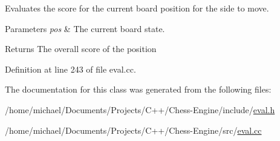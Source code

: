 Evaluates the score for the current board position for the side to move. 


\begin{DoxyParams}{Parameters}
{\em pos} & The current board state. \\
\hline
\end{DoxyParams}
\begin{DoxyReturn}{Returns}
The overall score of the position 
\end{DoxyReturn}


Definition at line 243 of file eval.\+cc.



The documentation for this class was generated from the following files\+:\begin{DoxyCompactItemize}
\item 
/home/michael/\+Documents/\+Projects/\+C++/\+Chess-\/\+Engine/include/\mbox{\hyperlink{eval_8h}{eval.\+h}}\item 
/home/michael/\+Documents/\+Projects/\+C++/\+Chess-\/\+Engine/src/\mbox{\hyperlink{eval_8cc}{eval.\+cc}}\end{DoxyCompactItemize}
